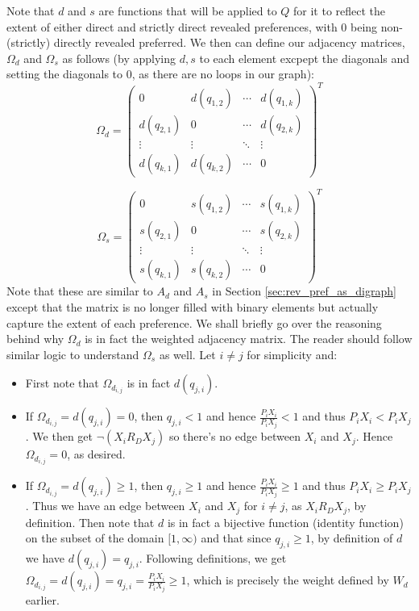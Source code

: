 \documentclass{article} %
\theoremstyle{style1}
\theoremstyle{example}
\begin{document}
Note that $d$ and $s$ are functions that will be applied to $Q$ for it to reflect the extent of either direct and strictly direct revealed preferences, with 0 being non-(strictly) directly revealed preferred. We then can define our adjacency matrices, $\Omega_d$ and $\Omega_s$ as follows (by applying $d,s$ to each element excpept the diagonals and setting the diagonals to 0, as there are no loops in our graph):
\[
\Omega_d =
  \begin{pmatrix}
  0 & d(q_{1,2}) & \cdots & d(q_{1,k}) \\
    d(q_{2,1}) & 0 & \cdots & d(q_{2,k}) \\
    \vdots & \vdots & \ddots & \vdots \\
    d(q_{k,1}) & d(q_{k,2}) & \cdots & 0
  \end{pmatrix}^T
\]

\[
\Omega_s =
  \begin{pmatrix}
  0 & s(q_{1,2}) & \cdots & s(q_{1,k}) \\
    s(q_{2,1}) & 0 & \cdots & s(q_{2,k}) \\
    \vdots & \vdots & \ddots & \vdots \\
    s(q_{k,1}) & s(q_{k,2}) & \cdots & 0
  \end{pmatrix} ^T
\]
Note that these are similar to $A_d$ and $A_s$ in Section \ref{sec:rev_pref_as_digraph} except that the matrix is no longer filled with binary elements but actually capture the extent of each preference. We shall briefly go over the reasoning behind why $\Omega_d$ is in fact the weighted adjacency matrix. The reader should follow similar logic to understand $\Omega_s$ as well. Let $i\not=j$ for simplicity and:
\begin{itemize}
  \item First note that $\Omega_{d_{i,j}}$ is in fact $d(q_{j,i})$.
  \item If $\Omega_{d_{i,j}}=d(q_{j,i})=0$, then $q_{j,i}<1$ and hence $\frac{P_iX_i}{P_iX_j}<1$ and thus $P_iX_i<P_iX_j$. We then get $\neg(X_i R_D X_j)$ so there's no edge between $X_i$ and $X_j$. Hence $\Omega_{d_{i,j}}=0$, as desired.
  \item If $\Omega_{d_{i,j}}=d(q_{j,i})\geq1$, then $q_{j,i}\geq1$ and hence $\frac{P_iX_i}{P_iX_j}\geq1$ and thus $P_iX_i\geq P_iX_j$. Thus we have an edge between $X_i$ and $X_j$ for $i\not=j$, as $X_iR_D X_j$, by definition. Then note that $d$ is in fact a bijective function (identity function) on the subset of the domain $[1,\infty)$ and that since $q_{j,i}\geq1$, by definition of $d$ we have $d(q_{j,i})=q_{j,i}$. Following definitions, we get $\Omega_{d_{i,j}}=d(q_{j,i})=q_{j,i}=\frac{P_iX_i}{P_iX_j}\geq1$, which is precisely the weight defined by $W_d$ earlier.
\end{itemize}
\end{document}
